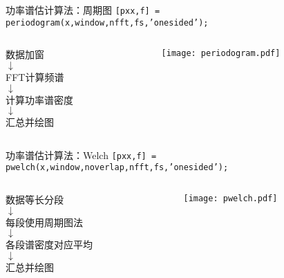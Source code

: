 \documentclass[UTF8]{ctexbeamer}
\begin{document}
\begin{frame}{功率谱估计算法：周期图}
    \texttt{[pxx,f] = periodogram(x,window,nfft,fs,'onesided');}
    \vspace{\fill}
    \begin{columns}
        \begin{column}{0.4\textwidth}
            \centering\normalsize
            数据加窗 \\
            $\downarrow$ \\
            FFT计算频谱 \\
            $\downarrow$ \\
            计算功率谱密度 \\
            $\downarrow$ \\
            汇总并绘图
        \end{column}
        \begin{column}{0.6\textwidth}
            \centering
            \texttt{[image: periodogram.pdf]}
        \end{column}
    \end{columns}
\end{frame}

\begin{frame}{功率谱估计算法：Welch}
    \texttt{[pxx,f] = pwelch(x,window,noverlap,nfft,fs,'onesided');}
    \vspace{\fill}
    \begin{columns}
        \begin{column}{0.4\textwidth}
            \centering\normalsize
            数据等长分段 \\
            $\downarrow$ \\
            每段使用周期图法 \\
            $\downarrow$ \\
            各段谱密度对应平均 \\
            $\downarrow$ \\
            汇总并绘图
        \end{column}
        \begin{column}{0.6\textwidth}
            \centering
            \texttt{[image: pwelch.pdf]}
        \end{column}
    \end{columns}
\end{frame}
\end{document}
